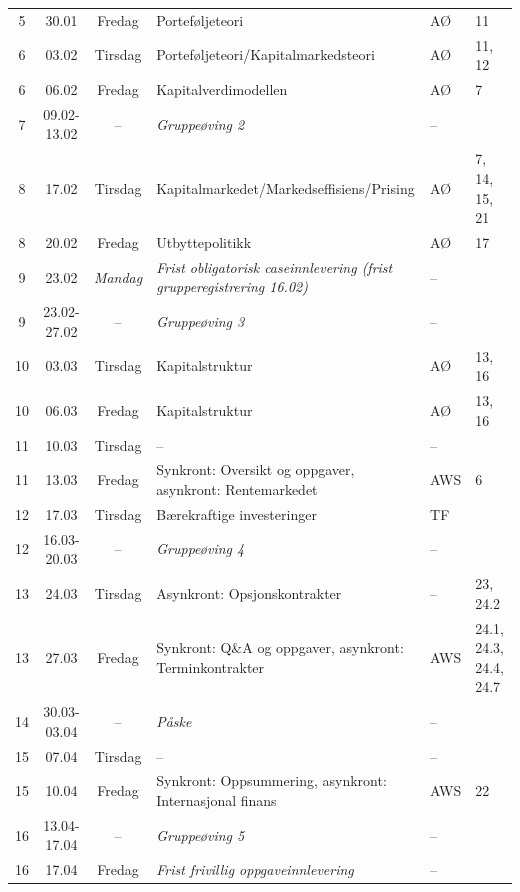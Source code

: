 \begin{table}[htbp!]
\begin{tabularx}{\textwidth}{cccXll}
5 & 30.01  & Fredag  & Porteføljeteori  & AØ & 11 \\
6 & 03.02  & Tirsdag & Porteføljeteori/Kapitalmarkedsteori & AØ & 11, 12 \\
6 & 06.02  & Fredag  & Kapitalverdimodellen & AØ  & 7\\
7 & 09.02-13.02  & -- & \textit{Gruppeøving 2} & -- &  \\
\midrule
8 & 17.02  & Tirsdag & Kapitalmarkedet/Markedseffisiens/Prising & AØ & 7, 14, 15, 21 \\
8 & 20.02  & Fredag  & Utbyttepolitikk & AØ & 17 \\
9 & 23.02  & \textit{Mandag} & \textit{Frist obligatorisk caseinnlevering (frist grupperegistrering 16.02)} & -- & \\
9 & 23.02-27.02  & -- & \textit{Gruppeøving 3} & --  & \\
\midrule
10 & 03.03 & Tirsdag & Kapitalstruktur & AØ & 13, 16 \\
10 & 06.03 & Fredag  & Kapitalstruktur & AØ &  13, 16 \\
11 & 10.03 & Tirsdag & --  & -- & \\
11 & 13.03 & Fredag  & Synkront: Oversikt og oppgaver, asynkront: Rentemarkedet & AWS  & 6 \\
12 & 17.03 & Tirsdag  & Bærekraftige investeringer & TF  & \\
12 & 16.03-20.03 & -- & \textit{Gruppeøving 4} & -- & \\
\midrule
13 & 24.03 & Tirsdag & Asynkront: Opsjonskontrakter & -- & 23, 24.2 \\
13 & 27.03 & Fredag  & Synkront: Q\&A og oppgaver, asynkront: Terminkontrakter  &  AWS & 24.1, 24.3, 24.4, 24.7\\
14 & 30.03-03.04 & -- &  \textit{Påske} & -- &  \\
15 & 07.04 & Tirsdag & --  & -- &  \\
15 & 10.04 & Fredag  & Synkront: Oppsummering, asynkront: Internasjonal finans  & AWS & 22 \\
16 & 13.04-17.04 & -- &\textit{ Gruppeøving 5} & -- & \\
16 & 17.04 & Fredag  & \textit{Frist frivillig oppgaveinnlevering}  & -- & \\
\bottomrule
\end{tabularx}
\end{table}

\newpage
